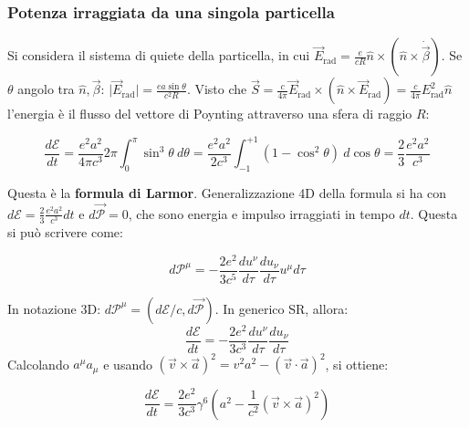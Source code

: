 \documentclass[10pt, a4paper]{scrartcl}
\numberwithin{equation}{subsection}
\theoremstyle{style1}
\newenvironment{boxenv}[1][]{
    \begin{eqbox}[#1]
    }{
   \end{eqbox}
}
\begin{document}
\subsubsection{Potenza irraggiata da una singola particella}

Si considera il sistema di quiete della particella, in cui $\vec{E}_\text{rad} = \frac{e}{cR} \hat{n}\times (\hat{n}\times  \dot{\vec{\beta }}) $. Se $\theta $ angolo tra $\hat{n}, \vec{\beta }$: $\lvert \vec{E}_\text{rad} \rvert = \frac{e a \sin \theta }{c^2 R}$. Visto che $\vec{S} = \frac{c}{4\pi} \vec{E}_{\text{rad}} \times (\hat{n}\times \vec{E}_\text{rad}) = \frac{c}{4\pi} E^2_\text{rad}\hat{n}$ l'energia \`e il flusso del vettore di Poynting attraverso una sfera di raggio $R$:
\begin{boxenv}[]
\begin{equation}
	\frac{d \mathcal{E}}{d t} = \frac{e^2 a^2}{4\pi c^3} 2\pi \int_{0} ^\pi \sin^3 \theta  \ d\theta  = \frac{e^2 a^2}{2c^3}\int_{-1} ^{+1}  (1- \cos^2 \theta ) \ d \cos\theta = \frac{2}{3}\frac{e^2 a^2}{c^3}
\end{equation}
\end{boxenv}
\noindent Questa \`e la \textbf{formula di Larmor}. Generalizzazione 4D della formula si ha con $d \mathcal{E } = \frac{2}{3} \frac{e^2a^2}{c^3}dt $ e $ d\vec{\mathcal{P}} = 0$, che sono energia e impulso irraggiati in tempo $dt$. Questa si pu\`o scrivere come:
\begin{boxenv}[]
\begin{equation}
	d \mathcal{P}^\mu  = - \frac{2 e^2}{3c^5} \frac{d u^\nu }{d \tau } \frac{d u_\nu }{d \tau } u^\mu  d\tau 
\end{equation}
\end{boxenv}
\noindent In notazione 3D: $d \mathcal{P}^\mu  = ( d \mathcal{E} / c , d\vec{\mathcal{P}})$. In generico SR, allora:
\begin{equation}
	\frac{d \mathcal{E}}{d t}  = - \frac{2e^2}{3c^3}\frac{d u^\nu }{d \tau } \frac{d u_\nu }{d \tau }
\end{equation}
Calcolando $a^\mu a_\mu $ e usando $(\vec{v}\times \vec{a})^2 = v^2 a^2 - (\vec{v}\cdot \vec{a})^2$, si ottiene:
\begin{boxenv}[]
\begin{equation}
	\frac{d \mathcal{E}}{d t} = \frac{2e^2}{3c^3} \gamma^6 \left(a^2 - \frac{1}{c^2 }(\vec{v}\times \vec{a})^2\right) 
\end{equation}
\end{boxenv}
\end{document}
